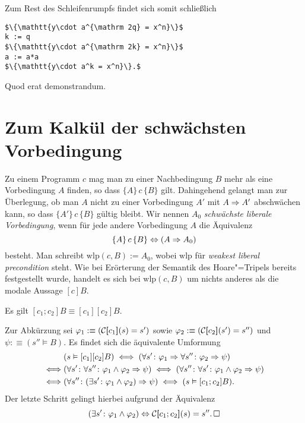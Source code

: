 Zum Rest des Schleifenrumpfs findet sich somit schließlich
\begin{lstlisting}[language=IMP, xleftmargin=\mathindent, mathescape]
$\{\mathtt{y\cdot a^{\mathrm 2q} = x^n}\}$
k := q
$\{\mathtt{y\cdot a^{\mathrm 2k} = x^n}\}$
a := a*a
$\{\mathtt{y\cdot a^k = x^n}\}.$
\end{lstlisting}
Quod erat demonstrandum.

\section{Zum Kalkül der schwächsten Vorbedingung}

Zu einem Programm $c$ mag man zu einer Nachbedingung $B$ mehr als eine
Vorbedingung $A$ finden, so dass $\{A\}\,c\,\{B\}$ gilt. Dahingehend
gelangt man zur Überlegung, ob man $A$ nicht zu einer Vorbedingung $A'$
mit $A\Rightarrow A'$ abschwächen kann, so dass $\{A'\}\,c\,\{B\}$ gültig
bleibt. Wir nennen $A_0$ \emph{schwächste liberale Vorbedingung},
wenn für jede andere Vorbedingung $A$ die Äquivalenz
\[\{A\}\,c\,\{B\}\Leftrightarrow (A\Rightarrow A_0)\]
besteht. Man schreibt $\mathrm{wlp}(c,B):=A_0$, wobei $\mathrm{wlp}$ für
\emph{weakest liberal precondition} steht. Wie bei Erörterung der
Semantik des Hoare"=Tripels bereits festgestellt wurde, handelt es sich
bei $\mathrm{wlp}(c,B)$ um nichts anderes als die modale Aussage $[c]B$.

\begin{Satz}
Es gilt $[c_1;c_2]B\equiv [c_1][c_2]B$.
\end{Satz}
\begin{Beweis}
Zur Abkürzung sei $\varphi_1:\equiv(\mathcal C[\hspace{-2.6pt}[c_1]\hspace{-2.4pt}](s)=s')$ sowie
$\varphi_2:\equiv(\mathcal C[\hspace{-2.6pt}[c_2]\hspace{-2.4pt}](s')=s'')$ und $\psi:\equiv (s''\models B)$.
Es findet sich die äquivalente Umformung
\begin{align*}
&(s\vDash [c_1][c_2]B) \iff (\forall s'\colon\varphi_1\Rightarrow \forall s''\colon\varphi_2\Rightarrow\psi)\\
\iff &(\forall s'\colon\forall s''\colon\varphi_1\land\varphi_2\Rightarrow\psi)
\iff (\forall s''\colon\forall s'\colon\varphi_1\land\varphi_2\Rightarrow\psi)\\
\iff &(\forall s''\colon (\exists s'\colon\varphi_1\land\varphi_2)\Rightarrow\psi)
\iff (s\vDash [c_1;c_2]B).
\end{align*}
Der letzte Schritt gelingt hierbei aufgrund der Äquivalenz
\[(\exists s'\colon\varphi_1\land\varphi_2)\Leftrightarrow
\mathcal C[\hspace{-2.6pt}[c_1;c_2]\hspace{-2.4pt}](s)=s''.\,\Box\]
\end{Beweis}

